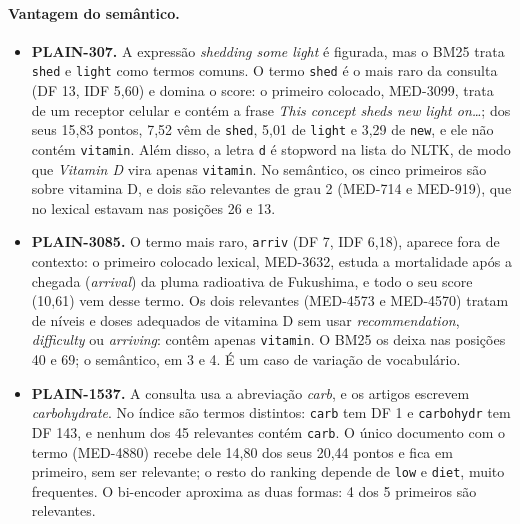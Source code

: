 \documentclass[11pt,a4paper]{article}
\newcommand{\cod}[1]{\texttt{#1}}
\begin{document}
\paragraph{Vantagem do semântico.}
\begin{itemize}
\item \textbf{PLAIN-307.} A expressão \emph{shedding some light} é figurada, mas o BM25 trata \cod{shed} e \cod{light} como termos comuns. O termo \cod{shed} é o mais raro da consulta (DF 13, IDF 5,60) e domina o score: o primeiro colocado, MED-3099, trata de um receptor celular e contém a frase \emph{This concept sheds new light on\ldots}; dos seus 15,83 pontos, 7,52 vêm de \cod{shed}, 5,01 de \cod{light} e 3,29 de \cod{new}, e ele não contém \cod{vitamin}. Além disso, a letra \cod{d} é stopword na lista do NLTK, de modo que \emph{Vitamin D} vira apenas \cod{vitamin}. No semântico, os cinco primeiros são sobre vitamina D, e dois são relevantes de grau 2 (MED-714 e MED-919), que no lexical estavam nas posições 26 e 13.
\item \textbf{PLAIN-3085.} O termo mais raro, \cod{arriv} (DF 7, IDF 6,18), aparece fora de contexto: o primeiro colocado lexical, MED-3632, estuda a mortalidade após a chegada (\emph{arrival}) da pluma radioativa de Fukushima, e todo o seu score (10,61) vem desse termo. Os dois relevantes (MED-4573 e MED-4570) tratam de níveis e doses adequados de vitamina D sem usar \emph{recommendation}, \emph{difficulty} ou \emph{arriving}: contêm apenas \cod{vitamin}. O BM25 os deixa nas posições 40 e 69; o semântico, em 3 e 4. É um caso de variação de vocabulário.
\item \textbf{PLAIN-1537.} A consulta usa a abreviação \emph{carb}, e os artigos escrevem \emph{carbohydrate}. No índice são termos distintos: \cod{carb} tem DF 1 e \cod{carbohydr} tem DF 143, e nenhum dos 45 relevantes contém \cod{carb}. O único documento com o termo (MED-4880) recebe dele 14,80 dos seus 20,44 pontos e fica em primeiro, sem ser relevante; o resto do ranking depende de \cod{low} e \cod{diet}, muito frequentes. O bi-encoder aproxima as duas formas: 4 dos 5 primeiros são relevantes.
\end{itemize}
\end{document}

